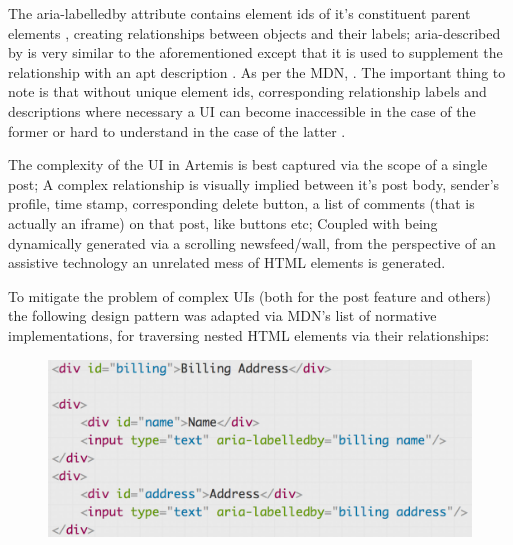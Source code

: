 The aria-labelledby attribute contains element ids of it's constituent parent elements \cite{MozillaDeveloperNetworkb}, creating relationships between objects and their labels; aria-described by is very similar to the aforementioned except that it is used to supplement the relationship with an apt description \cite{MozillaDeveloperNetworkd}. As per the MDN, . The important thing to note is that without unique element id\textquotesingle s, corresponding relationship labels and descriptions where necessary a UI can become inaccessible in the case of the former or  hard to understand in the case of the latter \cite{MozillaDeveloperNetworkb,MozillaDeveloperNetworkd}.

The complexity of the UI in Artemis is best captured via the scope of a  single post; A complex relationship is visually implied between it's post body, sender's profile, time stamp, corresponding delete button, a list of comments (that is actually an iframe) on that post, like buttons etc; Coupled with being dynamically generated via a scrolling newsfeed/wall, from the perspective of an assistive technology an unrelated mess of HTML elements is generated.


To mitigate the problem of complex UI\textquotesingle s (both for the post feature and others) the following design pattern was adapted via MDN's list of normative implementations, for traversing nested HTML elements via their relationships:

    \begin{figure}[h]
    	\includegraphics[scale=0.66,center]{chapters/appendices/figures/multipleLabel.png}
    \end{figure}

